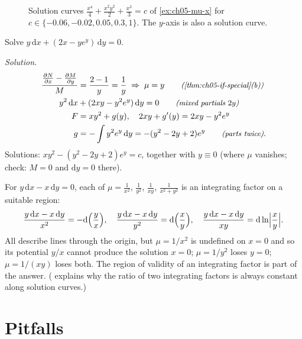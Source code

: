 \begin{figure}[ht]
  \centering
  
  \caption{Solution curves $\tfrac{x^4}{4} + \tfrac{x^2y^2}{2} + \tfrac{x^3}{3} = c$
  of \cref{ex:ch05-mu-x} for $c\in\{-0.06,-0.02,0.05,0.3,1\}$. The
  $y$-axis is also a solution curve.}
  \label{fig:ch05-levels}
\end{figure}

\begin{example}\label{ex:ch05-mu-y}
Solve $y\,\mathrm{d}x + (2x - ye^y)\,\mathrm{d}y = 0$.

\emph{Solution.}
\begin{align*}
  \frac{\pder{N}{x} - \pder{M}{y}}{M} &= \frac{2 - 1}{y} = \frac1y
     \;\Rightarrow\;\mu = y \why{\cref{thm:ch05-if-special}(b)}\\
  y^2\,\mathrm{d}x &+ (2xy - y^2e^y)\,\mathrm{d}y = 0 \why{mixed partials $2y$}\\
  F &= xy^2 + g(y),\quad 2xy + g'(y) = 2xy - y^2e^y\\
  g &= -\int y^2e^y\,\mathrm{d}y = -(y^2 - 2y + 2)e^y \why{parts twice}.
\end{align*}
Solutions: $xy^2 - (y^2 - 2y + 2)e^y = c$, together with $y\equiv 0$ (where
$\mu$ vanishes; check: $M = 0$ and $\mathrm{d}y = 0$ there).
\end{example}

\begin{example}\label{ex:ch05-many}
For $y\,\mathrm{d}x - x\,\mathrm{d}y = 0$, each of
$\mu = \frac1{x^2}$, $\frac1{y^2}$, $\frac{1}{xy}$, $\frac{1}{x^2+y^2}$ is an
integrating factor on a suitable region:
\[
  \frac{y\,\mathrm{d}x - x\,\mathrm{d}y}{x^2} = -\mathrm{d}\Bigl(\frac yx\Bigr),\quad
  \frac{y\,\mathrm{d}x - x\,\mathrm{d}y}{y^2} = \mathrm{d}\Bigl(\frac xy\Bigr),\quad
  \frac{y\,\mathrm{d}x - x\,\mathrm{d}y}{xy} = \mathrm{d}\ln\Bigl|\frac xy\Bigr| .
\]
All describe lines through the origin, but $\mu = 1/x^2$ is undefined on $x = 0$
and so its potential $y/x$ cannot produce the solution $x = 0$; $\mu = 1/y^2$
loses $y = 0$; $\mu = 1/(xy)$ loses both. The region of validity of an
integrating factor is part of the answer. ( explains why the
ratio of two integrating factors is always constant along solution curves.)
\end{example}

\section{Pitfalls}\label{sec:ch05-pitfalls}

